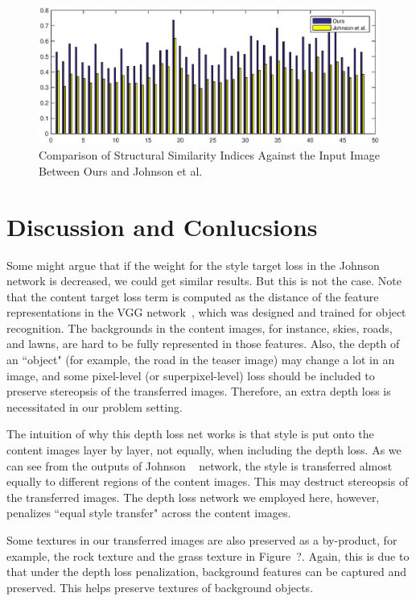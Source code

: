 \documentclass[10pt,twocolumn,letterpaper]{article}
\begin{document}
\begin{figure}
\centering
\includegraphics[scale=0.7]{ssim.eps}
\caption{Comparison of Structural Similarity Indices Against the Input Image Between Ours and Johnson et al. \cite{johnson2016perceptual}}
\label{fig:ssim}
\end{figure}

\section{Discussion and Conlucsions}

Some might argue that if the weight for the style target loss in the Johnson \etal~\cite{johnson2016perceptual} network is decreased, we could get similar results. But this is not the case. Note that the content target loss term is computed as the distance of the feature representations in the VGG network~\cite{simonyan2014very}, which was designed and trained for object recognition. The backgrounds in the content images, for instance, skies, roads, and lawns, are hard to be fully represented in those features. Also, the depth of an ``object" (for example, the road in the teaser image) may change a lot in an image, and some pixel-level (or superpixel-level) loss should be included to preserve stereopsis of the transferred images. Therefore, an extra depth loss is necessitated in our problem setting.  

The intuition of why this depth loss net works is that style is put onto the content images layer by layer, not equally, when including the depth loss. As we can see from the outputs of Johnson \etal~\cite{johnson2016perceptual} network, the style is transferred almost equally to different regions of the content images. This may destruct stereopsis of the transferred images. The depth loss network we employed here, however, penalizes ``equal style transfer" across the content images.  

Some textures in our transferred images are also preserved as a by-product, for example, the rock texture and the grass texture in Figure~?. Again, this is due to that under the depth loss penalization, background features can be captured and preserved. This helps preserve textures of background objects.
\end{document}
